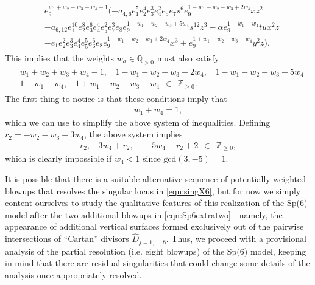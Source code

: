 \documentclass[11pt,oneside,english]{article}
\numberwithin{equation}{section}
\theoremstyle{definition}
\begin{document}
	\begin{align}
		\begin{split}
			&e_9^{w_1 + w_2 + w_3 + w_4 -1} (-a_{4,6} e_1^5 e_2^4 e_3^3 e_4^2 e_5 e_7 s^6 e_9^{1-w_1-w_2-w_3+2w_4}x z^2 \\&-a_{6,12}e_1^{10} e_2^8 e_3^6 e_4^4 e_5^2 e_7^3 e_8  e_9^{1-w_1-w_2-w_3+5w_4}s^{12} z^3 -\alpha e_9^{1-w_1-w_4}  t u x^2 z\\
			&-e_1 e_2^2 e_3^3 e_4^4 e_5^5 e_6^6 e_8  e_9^{1-w_1-w_2-w_3+2w_4}x^3 +e_9^{1+w_1-w_2-w_3-w_4}y^2 z ).
		\end{split}
	\end{align}
This implies that the weights $w_a \in \mathbb Q_{>0}$ must also satisfy
	\begin{align}
		\begin{split}
			&w_1 + w_2 + w_3 + w_4 - 1 ,~~~~
			1 - w_1 - w_2 -w_3 + 2 w_4 , ~~~~1 - w_1 -w_2 -w_3 + 5 w_4 \\
		&1-w_1 - w_4 ,~~~~1+ w_1 - w_2 - w_3 -w_4~~ \in~~ \mathbb Z_{\geq 0}.
		\end{split}
	\end{align}
The first thing to notice is that these conditions imply that
	\begin{align}
		w_1 + w_4 = 1,
	\end{align}
which we can use to simplify the above system of inequalities. Defining $r_2 = -w_2-w_3+3 w_4$, the above system implies
	\begin{align}
		r_2 ,~~~~ 3 w_4 + r_2 ,~~~~ -5 w_4 + r_2 + 2 ~~\in ~~ \mathbb Z_{\geq 0},
	\end{align}
which is clearly impossible if $w_4 < 1$ since $\text{gcd}(3,-5) =1$. 

It is possible that there is a suitable alternative sequence of potentially weighted blowups that resolves the singular locus in \cref{eqn:singX6}, but for now we simply content ourselves to study the qualitative features of this realization of the Sp(6) model after the two additional blowups in \cref{eqn:Sp6extratwo}---namely, the appearance of additional vertical surfaces formed exclusively out of the pairwise intersections of ``Cartan'' divisors $\hat D_{j=1,\dots,8}$. Thus, we proceed with a provisional analysis of the partial resolution (i.e. eight blowups) of the Sp(6) model, keeping in mind that there are residual singularities that could change some details of the analysis once appropriately resolved. 
\end{document}
